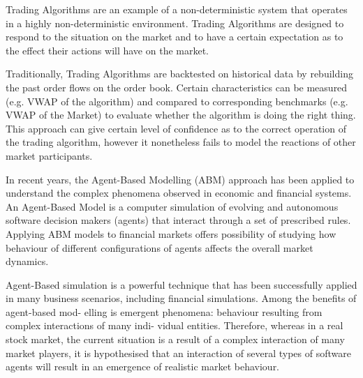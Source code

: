 Trading Algorithms are an example of a non-deterministic system that operates in a highly non-deterministic environment. Trading Algorithms are designed to respond to the situation on the market and to have a certain expectation as to the effect their actions will have on the market.

Traditionally, Trading Algorithms are backtested on historical data by rebuilding the past order flows on the order book. Certain characteristics can be measured (e.g. VWAP of the algorithm) and compared to corresponding benchmarks (e.g. VWAP of the Market) to evaluate whether the algorithm is doing the right thing. This approach can give certain level of confidence as to the correct operation of the trading algorithm, however it nonetheless fails to model the reactions of other market participants.

 In recent years, the Agent-Based Modelling (ABM) approach has been applied to understand the complex phenomena observed in economic and financial systems. An Agent-Based Model is a computer simulation of evolving and autonomous software decision makers (agents) that interact through a set of prescribed rules. Applying ABM models to financial markets offers possibility of studying how behaviour of different configurations of agents affects the overall market dynamics.

\pagebreak

Agent-Based simulation is a powerful technique that has been successfully applied in many business scenarios, including financial simulations. Among the benefits of agent-based mod- elling is emergent phenomena: behaviour resulting from complex interactions of many indi- vidual entities.
Therefore, whereas in a real stock market, the current situation is a result of a complex interaction of many market players, it is hypothesised that an interaction of several types of software agents will result in an emergence of realistic market behaviour.

